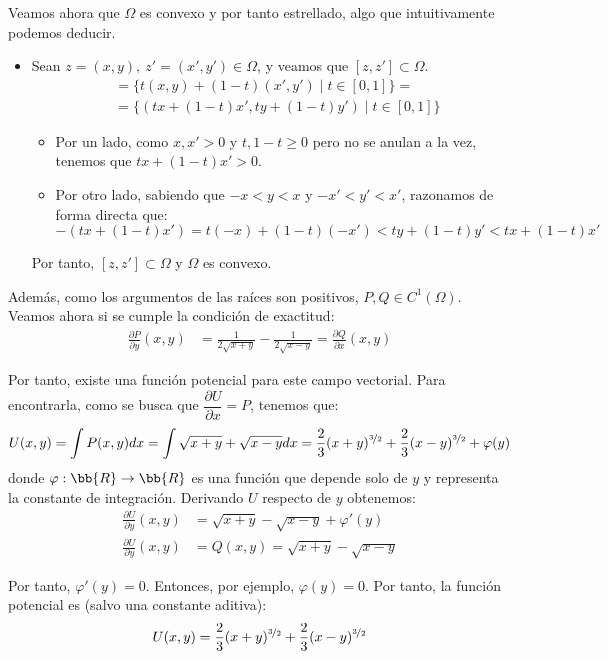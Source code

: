 \begin{ejercicio}
\begin{enumerate}
        Veamos ahora que $\Omega$ es convexo y por tanto estrellado, algo que intuitivamente podemos deducir.
        \begin{itemize}
            \item Sean $z=(x,y),~z'=(x',y')\in\Omega$, y veamos que $[z,z']\subset\Omega$.
            \begin{align*}
                [z,z']&=\{t(x,y)+(1-t)(x',y')\mid t\in[0,1]\}
                =\\&= \{(tx+(1-t)x',ty+(1-t)y')\mid t\in[0,1]\}
            \end{align*}
            \begin{itemize}
                \item Por un lado, como $x,x'>0$ y $t,1-t\geq 0$ pero no se anulan a la vez, tenemos que $tx+(1-t)x'>0$.
                \item Por otro lado, sabiendo que $-x<y<x$ y $-x'<y'<x'$, razonamos de forma directa que:
                \begin{equation*}
                    -(tx+(1-t)x')=t(-x)+(1-t)(-x')<ty+(1-t)y'<tx+(1-t)x'
                \end{equation*}
            \end{itemize}
            Por tanto, $[z,z']\subset\Omega$ y $\Omega$ es convexo.
        \end{itemize}

        Además, como los argumentos de las raíces son positivos, $P,Q\in C^1(\Omega)$. Veamos ahora si se cumple la condición de exactitud:
        \begin{align*}
            \frac{\partial P}{\partial y}(x,y) &= \frac{1}{2\sqrt{x+y}}-\frac{1}{2\sqrt{x-y}} = \frac{\partial Q}{\partial x}(x,y)
        \end{align*}

        Por tanto, existe una función potencial para este campo vectorial. Para encontrarla, como se busca que $\dfrac{\partial U}{\partial x}=P$, tenemos que:
        \begin{equation*}
            U(x,y)=\int P(x,y)dx =
            \int \sqrt{x+y}+\sqrt{x-y}dx = \frac{2}{3}(x+y)^{\nicefrac{3}{2}}+\frac{2}{3}(x-y)^{\nicefrac{3}{2}}+\varphi(y)
        \end{equation*}
        donde $\varphi:\bb{R}\to\bb{R}$ es una función que depende solo de $y$ y representa la constante de integración. Derivando $U$ respecto de $y$ obtenemos:
        \begin{align*}
            \frac{\partial U}{\partial y}(x,y)&=\sqrt{x+y}-\sqrt{x-y}+\varphi'(y) \\
            \frac{\partial U}{\partial y}(x,y)&=Q(x,y)=\sqrt{x+y}-\sqrt{x-y}
        \end{align*}

        Por tanto, $\varphi'(y)=0$. Entonces, por ejemplo, $\varphi(y)=0$. Por tanto, la función potencial es (salvo una constante aditiva):
        \begin{equation*}
            U(x,y)=\frac{2}{3}(x+y)^{\nicefrac{3}{2}}+\frac{2}{3}(x-y)^{\nicefrac{3}{2}}
        \end{equation*}
    \end{enumerate}
\end{ejercicio}
